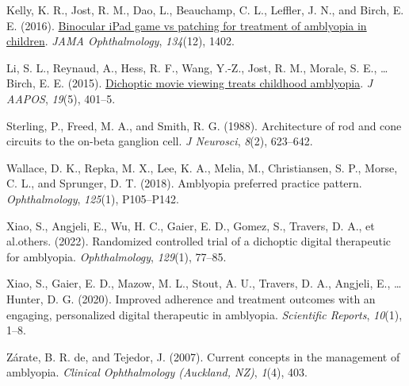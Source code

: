 \documentclass[
  onecolumn]{article}
\newlength{\cslhangindent}
\newenvironment{CSLReferences}[2] %
 {%
  \setlength{\parindent}{0pt}
  \ifodd #1 \everypar{\setlength{\hangindent}{\cslhangindent}}\ignorespaces\fi
  \ifnum #2 > 0
  \setlength{\parskip}{#2\baselineskip}
  \fi
 }%
 {}
\begin{document}
\begin{CSLReferences}{1}{0}
\leavevmode{}%
Kelly, K. R., Jost, R. M., Dao, L., Beauchamp, C. L., Leffler, J. N.,
and Birch, E. E. (2016).
\href{https://doi.org/10.1001/jamaophthalmol.2016.4224}{Binocular iPad
game vs patching for treatment of amblyopia in children}. \emph{JAMA
Ophthalmology}, \emph{134}(12), 1402.

\leavevmode{}%
Li, S. L., Reynaud, A., Hess, R. F., Wang, Y.-Z., Jost, R. M., Morale,
S. E., \ldots{} Birch, E. E. (2015).
\href{https://doi.org/10.1016/j.jaapos.2015.08.003}{Dichoptic movie
viewing treats childhood amblyopia}. \emph{J AAPOS}, \emph{19}(5),
401--5.

\leavevmode{}%
Sterling, P., Freed, M. A., and Smith, R. G. (1988). {Architecture of
rod and cone circuits to the on-beta ganglion cell}. \emph{J Neurosci},
\emph{8}(2), 623--642.

\leavevmode{}%
Wallace, D. K., Repka, M. X., Lee, K. A., Melia, M., Christiansen, S.
P., Morse, C. L., and Sprunger, D. T. (2018). Amblyopia preferred
practice pattern{\textregistered}. \emph{Ophthalmology}, \emph{125}(1),
P105--P142.

\leavevmode{}%
Xiao, S., Angjeli, E., Wu, H. C., Gaier, E. D., Gomez, S., Travers, D.
A., et al.others. (2022). Randomized controlled trial of a dichoptic
digital therapeutic for amblyopia. \emph{Ophthalmology}, \emph{129}(1),
77--85.

\leavevmode{}%
Xiao, S., Gaier, E. D., Mazow, M. L., Stout, A. U., Travers, D. A.,
Angjeli, E., \ldots{} Hunter, D. G. (2020). Improved adherence and
treatment outcomes with an engaging, personalized digital therapeutic in
amblyopia. \emph{Scientific Reports}, \emph{10}(1), 1--8.

\leavevmode{}%
Zárate, B. R. de, and Tejedor, J. (2007). Current concepts in the
management of amblyopia. \emph{Clinical Ophthalmology (Auckland, NZ)},
\emph{1}(4), 403.

\end{CSLReferences}
\end{document}
